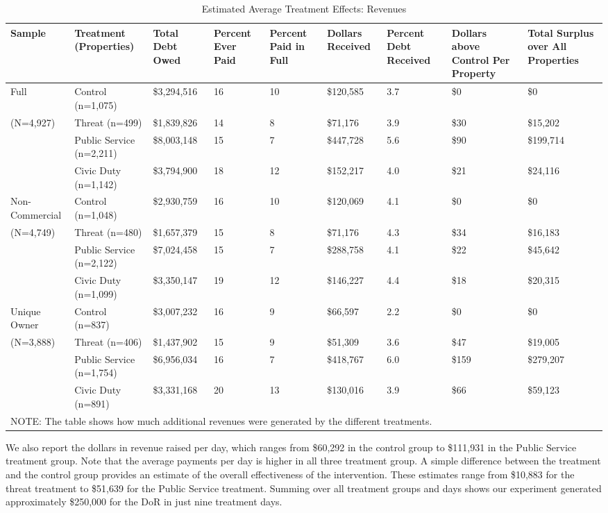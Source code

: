\documentclass[12pt,titlepage]{article}
\begin{document}
\begin{sidewaystable}[htbp]
\centering
\caption{Estimated Average Treatment Effects: Revenues} 
\label{table:summary}
\begin{tabular}{|p{2.2cm}|p{1.4cm}|p{1.8cm}|p{1.2cm}|p{1.2cm}|p{1.4cm}|p{1.4cm}|p{2.2cm}|p{1.8cm}|}
  \hline
Sample & Treatment (Properties) & Total Debt Owed & Percent Ever Paid & Percent Paid in Full & Dollars Received & Percent Debt Received & Dollars above Control Per Property & Total Surplus over All Properties \\ 
  \hline
Full & Control (n=1,075) & \$3,294,516 & 16 & 10 & \$120,585 & 3.7 & \$0 & \$0 \\ 
  (N=4,927) & Threat (n=499) & \$1,839,826 & 14 & 8 & \$71,176 & 3.9 & \$30 & \$15,202 \\ 
   & Public Service (n=2,211) & \$8,003,148 & 15 & 7 & \$447,728 & 5.6 & \$90 & \$199,714 \\ 
   & Civic Duty (n=1,142) & \$3,794,900 & 18 & 12 & \$152,217 & 4.0 & \$21 & \$24,116 \\ 
   \hline
Non-Commercial & Control (n=1,048) & \$2,930,759 & 16 & 10 & \$120,069 & 4.1 & \$0 & \$0 \\ 
  (N=4,749) & Threat (n=480) & \$1,657,379 & 15 & 8 & \$71,176 & 4.3 & \$34 & \$16,183 \\ 
   & Public Service (n=2,122) & \$7,024,458 & 15 & 7 & \$288,758 & 4.1 & \$22 & \$45,642 \\ 
   & Civic Duty (n=1,099) & \$3,350,147 & 19 & 12 & \$146,227 & 4.4 & \$18 & \$20,315 \\ 
   \hline
Unique Owner & Control (n=837) & \$3,007,232 & 16 & 9 & \$66,597 & 2.2 & \$0 & \$0 \\ 
  (N=3,888) & Threat (n=406) & \$1,437,902 & 15 & 9 & \$51,309 & 3.6 & \$47 & \$19,005 \\ 
   & Public Service (n=1,754) & \$6,956,034 & 16 & 7 & \$418,767 & 6.0 & \$159 & \$279,207 \\ 
   & Civic Duty (n=891) & \$3,331,168 & 20 & 13 & \$130,016 & 3.9 & \$66 & \$59,123 \\ 
   \hline
\multicolumn{9}{l}{NOTE: The table shows how much additional revenues were generated by the different treatments.} \\
\end{tabular}
\end{sidewaystable}


We also report the dollars in revenue raised per day, which ranges
from \$60,292 in the control group to \$111,931 in the Public Service
treatment group. Note that the average payments per day is higher in
all three treatment group. A simple difference between the treatment
and the control group provides an estimate of the overall
effectiveness of the intervention. These estimates range from \$10,883
for the threat treatment to \$51,639 for the Public Service
treatment. Summing over all treatment groups and days shows 
our experiment generated approximately \$250,000 for the DoR in just
nine treatment days.  
\end{document}
